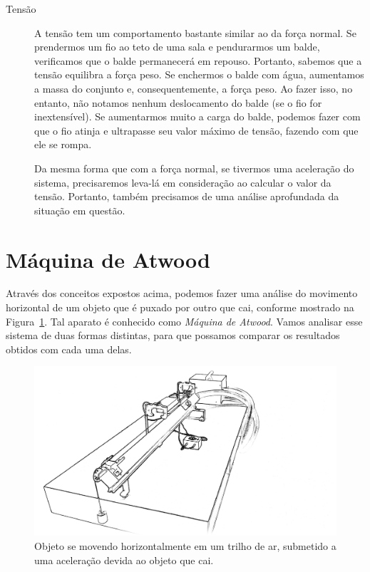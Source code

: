 \begin{description}
\item[Tensão] A tensão tem um comportamento bastante similar ao da força normal. Se prendermos um fio ao teto de uma sala e pendurarmos um balde, verificamos que o balde permanecerá em repouso. Portanto, sabemos que a tensão equilibra a força peso. Se enchermos o balde com água, aumentamos a massa do conjunto e, consequentemente, a força peso. Ao fazer isso, no entanto, não notamos nenhum deslocamento do balde (se o fio for inextensível). Se aumentarmos muito a carga do balde, podemos fazer com que o fio atinja e ultrapasse seu valor máximo de tensão, fazendo com que ele se rompa.

	Da mesma forma que com a força normal, se tivermos uma aceleração do sistema, precisaremos leva-lá em consideração ao calcular o valor da tensão. Portanto, também precisamos de uma análise aprofundada da situação em questão.
\end{description}

\section{Máquina de Atwood}

Através dos conceitos expostos acima, podemos fazer uma análise do movimento horizontal de um objeto que é puxado por outro que cai, conforme mostrado na Figura~\ref{FigTrilhoDeAr}. Tal aparato é conhecido como \emph{Máquina de Atwood}. Vamos analisar esse sistema de duas formas distintas, para que possamos comparar os resultados obtidos com cada uma delas.

\begin{figure}
\centering
\includegraphics[width=\textwidth]{Ilustrations/TrilhoAr.png}
\caption{Objeto se movendo horizontalmente em um trilho de ar, submetido a uma aceleração devida ao objeto que cai.}
\label{FigTrilhoDeAr}
\end{figure}


